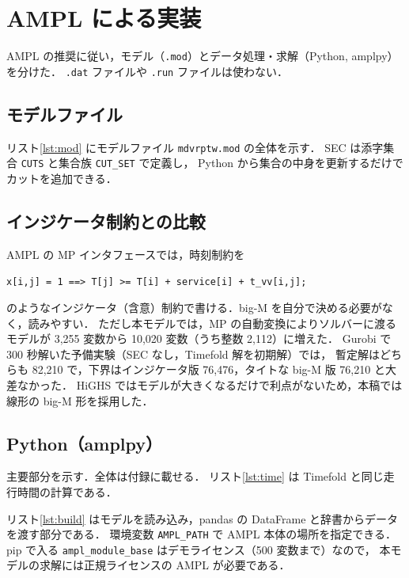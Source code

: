 \documentclass[11pt,a4paper]{ltjsarticle}
\begin{document}
\section{AMPL による実装}

AMPL の推奨に従い，モデル（\texttt{.mod}）とデータ処理・求解（Python, amplpy）を分けた．
\texttt{.dat} ファイルや \texttt{.run} ファイルは使わない．

\subsection{モデルファイル}

リスト\ref{lst:mod} にモデルファイル \texttt{mdvrptw.mod} の全体を示す．
SEC は添字集合 \texttt{CUTS} と集合族 \texttt{CUT\_SET} で定義し，
Python から集合の中身を更新するだけでカットを追加できる．



\subsection{インジケータ制約との比較}

AMPL の MP インタフェースでは，時刻制約を
\begin{center}
  \verb|x[i,j] = 1 ==> T[j] >= T[i] + service[i] + t_vv[i,j];|
\end{center}
のようなインジケータ（含意）制約で書ける．big-M を自分で決める必要がなく，読みやすい．
ただし本モデルでは，MP の自動変換によりソルバーに渡るモデルが
3,255 変数から 10,020 変数（うち整数 2,112）に増えた．
Gurobi で 300 秒解いた予備実験（SEC なし，Timefold 解を初期解）では，
暫定解はどちらも 82,210 で，下界はインジケータ版 76,476，タイトな big-M 版 76,210 と大差なかった．
HiGHS ではモデルが大きくなるだけで利点がないため，本稿では線形の big-M 形を採用した．

\subsection{Python（amplpy）}

主要部分を示す．全体は付録に載せる．
リスト\ref{lst:time} は Timefold と同じ走行時間の計算である．



リスト\ref{lst:build} はモデルを読み込み，pandas の DataFrame と辞書からデータを渡す部分である．
環境変数 \texttt{AMPL\_PATH} で AMPL 本体の場所を指定できる．
pip で入る \texttt{ampl\_module\_base} はデモライセンス（500 変数まで）なので，
本モデルの求解には正規ライセンスの AMPL が必要である．
\end{document}
